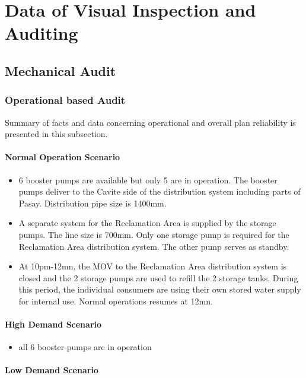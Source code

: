 \chapter{Data of Visual Inspection and Auditing} \label{Chapter4}
\section{Mechanical Audit}
\label{42}
\subsection{Operational based Audit}
Summary of facts and data concerning operational and overall plan reliability is presented in this subsection.

\subsubsection{Normal Operation Scenario}
\begin{itemize}
\item 6 booster pumps are available but only 5 are in operation. The booster pumps deliver to the Cavite side of the distribution system including parts of Pasay. Distribution pipe size is 1400mm. 
\item A separate system for the Reclamation Area is supplied by the storage pumps. The line size is 700mm. Only one storage pump is required for the Reclamation Area distribution system. The other pump serves as standby. 
\item At 10pm-12mn, the MOV to the Reclamation Area distribution system is closed and the 2 storage pumps are used to refill the 2 storage tanks. During this period, the individual consumers are using their own stored water supply for internal use. Normal operations resumes at 12mn.
\end{itemize}

\subsubsection{High Demand Scenario}

\begin{itemize}
	\item all 6 booster pumps are in operation
\end{itemize}

\subsubsection{Low Demand Scenario}

